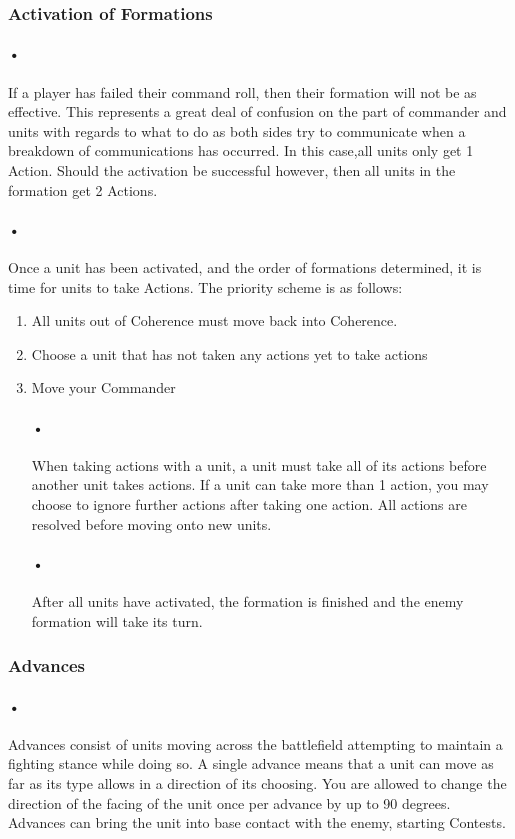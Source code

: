 \documentclass[12pt]{article}
\begin{document}
\subsubsection{Activation of Formations}
\paragraph{•}
If a player has failed their command roll, then their formation will not be as effective. This represents a great deal of confusion on the part of commander and units with regards to what to do as both sides try to communicate when a breakdown of communications has occurred. In this case,all units only get 1 Action. Should the activation be successful however, then all units in the formation get 2 Actions.

\paragraph{•}
Once a unit has been activated, and the order of formations determined, it is time for units to take Actions. The priority scheme is as follows:
\begin{enumerate}
\item All units out of Coherence must move back into Coherence.
\item Choose a unit that has not taken any actions yet to take actions
\item Move your Commander 

\paragraph{•}
When taking actions with a unit, a unit must take all of its actions before another unit takes actions. If a unit can take more than 1 action, you may choose to ignore further actions after taking one action. All actions are resolved before moving onto new units.

\paragraph{•}
After all units have activated, the formation is finished and the enemy formation will take its turn.
\end{enumerate}
\subsubsection{Advances}
\paragraph{•}
Advances consist of units moving across the battlefield attempting to maintain a fighting stance while doing so. A single advance means that a unit can move as far as its type allows in a direction of its choosing. You are allowed to change the direction of the facing of the unit once per advance by up to 90 degrees. Advances can bring the unit into base contact with the enemy, starting Contests.
\end{document}
